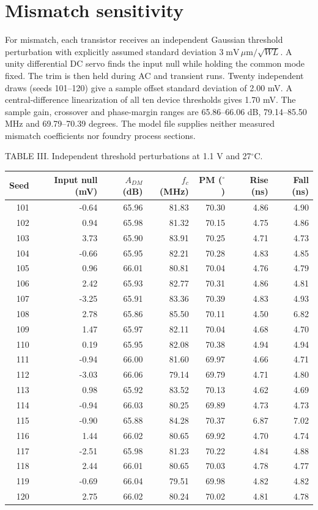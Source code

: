 \documentclass[10pt,journal]{IEEEtran}
\begin{document}
\section{Mismatch sensitivity}\label{sec:mismatch}
For mismatch, each transistor receives an independent Gaussian threshold perturbation with explicitly assumed standard deviation $3\;\mathrm{mV}\,\mu\mathrm{m}/\sqrt{WL}$. A unity differential DC servo finds the input null while holding the common mode fixed. The trim is then held during AC and transient runs. Twenty independent draws (seeds 101--120) give a sample offset standard deviation of 2.00 mV. A central-difference linearization of all ten device thresholds gives 1.70 mV. The sample gain, crossover and phase-margin ranges are 65.86--66.06 dB, 79.14--85.50 MHz and 69.79--70.39 degrees. The model file supplies neither measured mismatch coefficients nor foundry process sections.
\begin{center}
TABLE III. Independent threshold perturbations at 1.1 V and 27$^\circ$C.\\[4pt]
\begin{tabular}{@{}rrrrrrr@{}}\toprule
Seed & Input null (mV) & $A_{DM}$ (dB) & $f_c$ (MHz) & PM ($^\circ$) & Rise (ns) & Fall (ns) \\ \midrule
101 & -0.64 & 65.96 & 81.83 & 70.30 & 4.86 & 4.90 \\
102 & 0.94 & 65.98 & 81.32 & 70.15 & 4.75 & 4.86 \\
103 & 3.73 & 65.90 & 83.91 & 70.25 & 4.71 & 4.73 \\
104 & -0.66 & 65.95 & 82.21 & 70.28 & 4.83 & 4.85 \\
105 & 0.96 & 66.01 & 80.81 & 70.04 & 4.76 & 4.79 \\
106 & 2.42 & 65.93 & 82.77 & 70.31 & 4.86 & 4.81 \\
107 & -3.25 & 65.91 & 83.36 & 70.39 & 4.83 & 4.93 \\
108 & 2.78 & 65.86 & 85.50 & 70.11 & 4.50 & 6.82 \\
109 & 1.47 & 65.97 & 82.11 & 70.04 & 4.68 & 4.70 \\
110 & 0.19 & 65.95 & 82.08 & 70.38 & 4.94 & 4.94 \\
111 & -0.94 & 66.00 & 81.60 & 69.97 & 4.66 & 4.71 \\
112 & -3.03 & 66.06 & 79.14 & 69.79 & 4.71 & 4.80 \\
113 & 0.98 & 65.92 & 83.52 & 70.13 & 4.62 & 4.69 \\
114 & -0.94 & 66.03 & 80.25 & 69.89 & 4.73 & 4.73 \\
115 & -0.90 & 65.88 & 84.28 & 70.37 & 6.87 & 7.02 \\
116 & 1.44 & 66.02 & 80.65 & 69.92 & 4.70 & 4.74 \\
117 & -2.51 & 65.98 & 81.23 & 70.22 & 4.84 & 4.88 \\
118 & 2.44 & 66.01 & 80.65 & 70.03 & 4.78 & 4.77 \\
119 & -0.69 & 66.04 & 79.51 & 69.98 & 4.82 & 4.82 \\
120 & 2.75 & 66.02 & 80.24 & 70.02 & 4.81 & 4.78 \\
\bottomrule\end{tabular}
\end{center}
\end{document}
